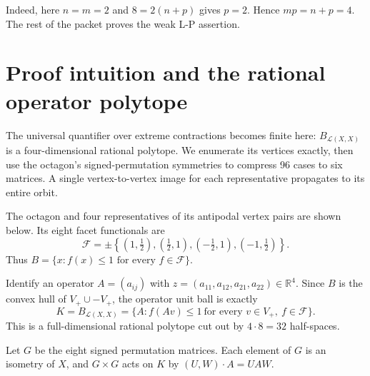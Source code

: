 \documentclass[11pt]{article}
\newcommand{\Lop}{\mathcal L}
\begin{document}
Indeed, here $n=m=2$ and $8=2(n+p)$ gives $p=2$. Hence $mp=n+p=4$.
The rest of the packet proves the weak L-P assertion.

\section{Proof intuition and the rational operator polytope}

The universal quantifier over extreme contractions becomes finite here:
$B_{\Lop(X,X)}$ is a four-dimensional rational polytope. We enumerate its
vertices exactly, then use the octagon's signed-permutation symmetries to
compress 96 cases to six matrices. A single vertex-to-vertex image for each
representative propagates to its entire orbit.

The octagon and four representatives of its antipodal vertex pairs are shown
below. Its eight facet functionals are
\[
 \mathcal F=\pm\left\{
 (1,\tfrac12),(\tfrac12,1),(-\tfrac12,1),(-1,\tfrac12)
 \right\}.
\]
Thus $B=\{x:f(x)\le1\text{ for every }f\in\mathcal F\}$.

\begin{center}
\end{center}

Identify an operator $A=(a_{ij})$ with
$z=(a_{11},a_{12},a_{21},a_{22})\in\mathbb R^4$. Since $B$ is the
convex hull of $V_+\cup -V_+$, the operator unit ball is exactly
\[
 K=B_{\Lop(X,X)}=
 \{A:f(Av)\le1\ \text{for every }v\in V_+,\ f\in\mathcal F\}. \tag{2}
\]
This is a full-dimensional rational polytope cut out by $4\cdot8=32$
half-spaces.

Let $G$ be the eight signed permutation matrices. Each element of $G$ is an
isometry of $X$, and $G\times G$ acts on $K$ by
$(U,W)\cdot A=UAW$.
\end{document}
